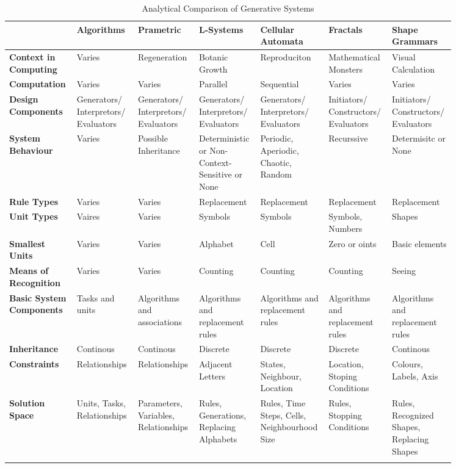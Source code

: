 \begin{landscape}
\centering
\begin{longtable}{*{7}{p{0.121\linewidth}}}
 &\textbf{Algorithms}&\textbf{Prametric}&\textbf{L-Systems}&\textbf{Cellular Automata}&\textbf{Fractals}&\textbf{Shape Grammars}\\\midrule
\textbf{Context in Computing}&Varies&Regeneration&Botanic Growth&Reproduciton&Mathematical Monsters&Visual Calculation\\\midrule
\textbf{Computation}&Varies&Varies&Parallel&Sequential&Varies&Varies\\\midrule
\textbf{Design Components}&Generators/ Interpretors/ Evaluators&Generators/ Interpretors/ Evaluators&Generators/ Interpretors/ Evaluators&Generators/ Interpretors/ Evaluators&Initiators/ Constructors/ Evaluators&Initiators/ Constructors/ Evaluators\\\midrule
\textbf{System Behaviour}&Varies&Possible Inheritance&Deterministic or Non-Context-Sensitive or None&Periodic, Aperiodic, Chaotic, Random&Recurssive&Determisitc or None\\\midrule
\textbf{Rule Types}&Varies&Varies&Replacement&Replacement&Replacement&Replacement\\\midrule
\textbf{Unit Types}&Vaires&Varies&Symbols&Symbols&Symbols, Numbers&Shapes\\\midrule
\textbf{Smallest Units}&Varies&Varies&Alphabet&Cell&Zero or oints&Basic elements\\\midrule
\textbf{Means of Recognition}&Varies&Varies&Counting&Counting&Counting&Seeing\\\midrule
\textbf{Basic System Components}&Tasks and units&Algorithms and associations&Algorithms and replacement rules&Algorithms and replacement rules&Algorithms and replacement rules&Algorithms and replacement rules\\\midrule
\textbf{Inheritance}&Continous&Continous&Discrete&Discrete&Discrete&Continous\\\midrule
\textbf{Constraints}&Relationships&Relationships&Adjacent Letters&States, Neighbour, Location&Location, Stoping Conditions&Colours, Labels, Axis\\\midrule
\textbf{Solution Space}&Units, Tasks, Relationships&Parameters, Variables, Relationships&Rules, Generations, Replacing Alphabets&Rules, Time Steps, Cells, Neighbourhood Size&Rules, Stopping Conditions&Rules, Recognized Shapes, Replacing Shapes\\
\bottomrule
\caption[Analytical Comparison of Generative Systems]{Analytical Comparison of Generative Systems \cite{khaldi04}}
\label{tab:GenerativeRecap}
\end{longtable}
\end{landscape}

